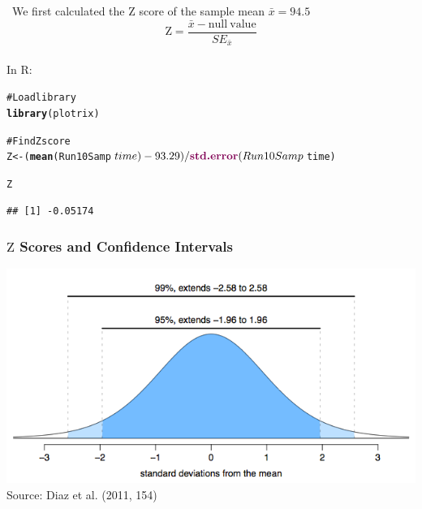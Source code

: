 \documentclass{beamer}\usepackage{graphicx, color}
\makeatletter
\newcommand{\hlfunctioncall}[1]{\textcolor[rgb]{0.501960784313725,0,0.329411764705882}{\textbf{#1}}}%
\newcommand{\hlcomment}[1]{\textcolor[rgb]{0.180392156862745,0.6,0.341176470588235}{#1}}%
\newenvironment{kframe}{%
 \def\at@end@of@kframe{}%
 \ifinner\ifhmode%
  \def\at@end@of@kframe{\end{minipage}}%
  \begin{minipage}{\columnwidth}%
 \fi\fi%
 \def\FrameCommand##1{\hskip\@totalleftmargin \hskip-\fboxsep
 \colorbox{shadecolor}{##1}\hskip-\fboxsep
     \hskip-\linewidth \hskip-\@totalleftmargin \hskip\columnwidth}%
 \MakeFramed {\advance\hsize-\width
   \@totalleftmargin\z@ \linewidth\hsize
   \@setminipage}}%
 {\par\unskip\endMakeFramed%
 \at@end@of@kframe}
\newenvironment{knitrout}{}{} %
\makeatother
\begin{document}
\begin{frame}[fragile]
\
  We first calculated the $\mathrm{Z}$ score of the sample mean $\bar{x} = 94.5$
\[
  \mathrm{Z} = \frac{\bar{x} - \mathrm{null\:value}}{SE_{\bar{x}}}
\]\\[0.25cm]
In R:
\begin{knitrout}
\color{fgcolor}\begin{kframe}
\begin{alltt}
\hlcomment{# Load library}
\hlfunctioncall{library}(plotrix)

\hlcomment{# Find Z score }
Z <- (\hlfunctioncall{mean}(Run10Samp$time) - 93.29)/
      \hlfunctioncall{std.error}(Run10Samp$time)

Z
\end{alltt}
\begin{verbatim}
## [1] -0.05174
\end{verbatim}
\end{kframe}
\end{knitrout}

\end{frame}

\begin{frame}
  \frametitle{$\mathrm{Z}$ Scores and Confidence Intervals}
  \begin{center}
    \includegraphics[scale=0.45]{figure/ZScore.png} \\
    Source: Diaz et al. (2011, 154)
  \end{center}
\end{frame}
\end{document}
